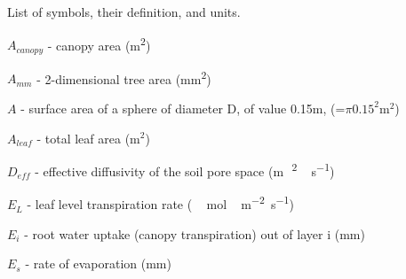 

List of symbols, their definition, and units.
{\footnotesize
\begin{description} %


\item $A _{canopy}$  -  canopy area (\unit{m^{2}}) 
\item $A _{mm}$  -  2-dimensional tree area (\unit{mm^{2}}) 
\item $A$  -  surface area of a sphere of diameter D, of value 0.15m, (=$\pi 0.15^{2}$m$^{2}$) 
\item $A_{leaf}$  -  total leaf area (m$^{2}$) 
\item $D_{eff}$  -  effective diffusivity of the soil pore space (\unit{m\,^{2}\,s^{-1}}) 
\item $E_{L}$  -  leaf level transpiration rate (\unit{\mu\,mol\,m^{-2}s^{-1}}) 
\item $E_{i}$  -   root water uptake (canopy transpiration) out of layer i (\unit{mm}) 
\item $E_{s}$  -  rate of evaporation (\unit{mm}) 

\end{description}}

